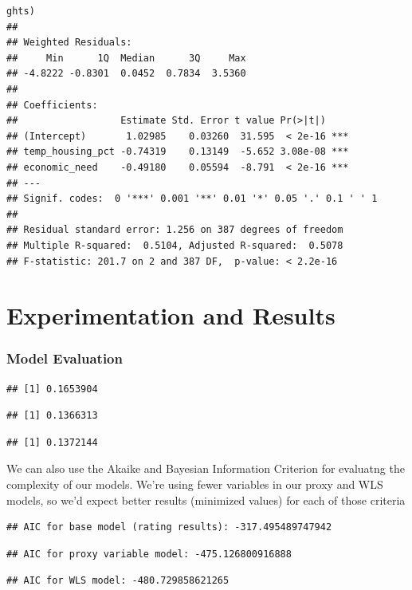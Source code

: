 \documentclass[
  man]{apa6}
\begin{document}
\begin{verbatim}
ghts)
## 
## Weighted Residuals:
##     Min      1Q  Median      3Q     Max 
## -4.8222 -0.8301  0.0452  0.7834  3.5360 
## 
## Coefficients:
##                  Estimate Std. Error t value Pr(>|t|)    
## (Intercept)       1.02985    0.03260  31.595  < 2e-16 ***
## temp_housing_pct -0.74319    0.13149  -5.652 3.08e-08 ***
## economic_need    -0.49180    0.05594  -8.791  < 2e-16 ***
## ---
## Signif. codes:  0 '***' 0.001 '**' 0.01 '*' 0.05 '.' 0.1 ' ' 1
## 
## Residual standard error: 1.256 on 387 degrees of freedom
## Multiple R-squared:  0.5104, Adjusted R-squared:  0.5078 
## F-statistic: 201.7 on 2 and 387 DF,  p-value: < 2.2e-16
\end{verbatim}

\hypertarget{experimentation-and-results}{%
\section{Experimentation and Results}\label{experimentation-and-results}}

\hypertarget{model-evaluation}{%
\subsubsection{Model Evaluation}\label{model-evaluation}}

\begin{verbatim}
## [1] 0.1653904
\end{verbatim}

\begin{verbatim}
## [1] 0.1366313
\end{verbatim}

\begin{verbatim}
## [1] 0.1372144
\end{verbatim}

We can also use the Akaike and Bayesian Information Criterion for evaluatng the complexity of our models. We're using fewer variables in our proxy and WLS models, so we'd expect better results (minimized values) for each of those criteria

\begin{verbatim}
## AIC for base model (rating results): -317.495489747942
\end{verbatim}

\begin{verbatim}
## AIC for proxy variable model: -475.126800916888
\end{verbatim}

\begin{verbatim}
## AIC for WLS model: -480.729858621265
\end{verbatim}
\end{document}
